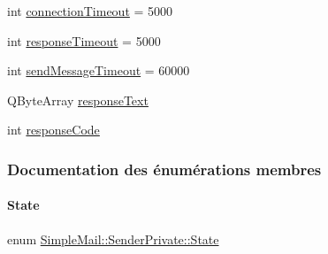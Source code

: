 \begin{DoxyCompactItemize}
\item 
int \hyperlink{class_simple_mail_1_1_sender_private_a9328b6f8c9df4ce6e8517ec713f42421}{connection\+Timeout} = 5000
\item 
int \hyperlink{class_simple_mail_1_1_sender_private_a970745d144eb65e5fa2dae5677b98438}{response\+Timeout} = 5000
\item 
int \hyperlink{class_simple_mail_1_1_sender_private_ac78cceae200dd8794a4a1ac4e79e8762}{send\+Message\+Timeout} = 60000
\item 
Q\+Byte\+Array \hyperlink{class_simple_mail_1_1_sender_private_ad355d66dfce2628cb0e7e83a5f65d27e}{response\+Text}
\item 
int \hyperlink{class_simple_mail_1_1_sender_private_ac612465360ce40cfa71310f5f7353b3d}{response\+Code}
\end{DoxyCompactItemize}


\subsubsection{Documentation des énumérations membres}
\mbox{\label{class_simple_mail_1_1_sender_private_ae09befddf0fae8e8f2ea153ead2b8b0a}} 
\paragraph{\texorpdfstring{State}{State}}
{\footnotesize\ttfamily enum \hyperlink{class_simple_mail_1_1_sender_private_ae09befddf0fae8e8f2ea153ead2b8b0a}{Simple\+Mail\+::\+Sender\+Private\+::\+State}}

